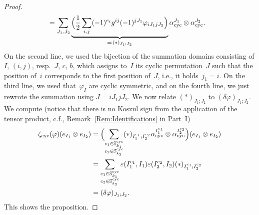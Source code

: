 \documentclass[\MainFolder/Text.tex]{subfiles}
\begin{document}
\begin{proof}
\begin{align*}
 & = \sum_{J_1, J_2}\underbrace{\Bigl(\frac{1}{2}\sum_{i,j} (-1)^{e_i} g^{ij}(-1)^{j J_1} \varphi_{i J_1 j J_2} \Bigr)}_{\eqqcolon(*)_{J_1;J_2}}\alpha^{J_1}_{\mathrm{cyc}}\otimes\alpha^{J_2}_{\mathrm{cyc}}.
\end{align*}
On the second line, we used the bijection of the summation domains consisting of $I$, $(i,j)$, resp.~$J$, $c$, $b$, which assigns to~$I$ its cyclic permutation~$J$ such that the position of~$i$ corresponds to the first position of~$J$, i.e., it holds~$j_1 = i$. On the third line, we used that~$\varphi_I$ are cyclic symmetric, and on the fourth line, we just rewrote the summation using $J = i J_1 j J_2$. We now relate $(*)_{J_1;J_2}$ to $(\delta\varphi)_{J_1;J_2}$. We compute (notice that there is no Koszul sign from the application of the tensor product, c.f., Remark~\ref{Rem:Identifications} in Part~I)
\begin{align*}
\zeta_{\text{cyc}}(\varphi)(e_{I_1}\otimes e_{I_2}) & = \Bigl(\sum_{\substack{c_1\in\mathbb{S}^{\mathrm{cyc}}_{k_1}\\c_2\in\mathbb{S}^{\mathrm{cyc}}_{k_2}}}(*)_{I_1^{c_1};I_2^{c_2}}\alpha_{\mathrm{cyc}}^{I_1^{c_1}}\otimes\alpha_{\mathrm{cyc}}^{I_2^{c_2}}\Bigr)(e_{I_1}\otimes e_{I_2}) \\
& = \sum_{\substack{c_1\in\mathbb{S}^{\mathrm{cyc}}_{k_1}\\c_2\in\mathbb{S}^{\mathrm{cyc}}_{k_2}}}\varepsilon(I_1^{c_1},I_1)\varepsilon(I_2^{c_2},I_2)(*)_{I_1^{c_1};I_2^{c_2}} \\
& = (\delta\varphi)_{J_1;J_2}.
\end{align*}
This shows the proposition.
\end{proof}
\end{document}
